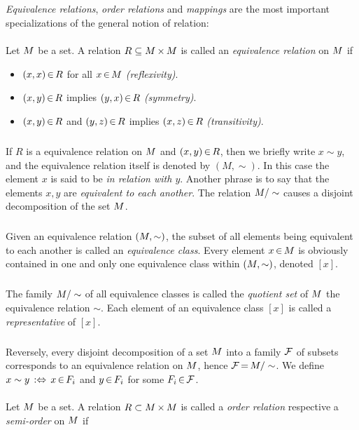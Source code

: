\documentclass[11pt,twoside]{article}
\begin{document}
\subparagraph{}
\textit{Equivalence relations}, \textit{order relations}
and \textit{mappings} are the most important specializations
of the general notion of relation:

\paragraph{} %
Let $\setM$ be a set.
A relation $R \subseteq \cross{\setM}{\setM}$ is called
an \textit{equivalence relation} on $\setM$ if

\begin{itemize}[leftmargin=15pt]
\item[1.] $(x,x) \xeof R$ for all $x \xeof \setM$ \textit{(reflexivity)}.
\item[2.] $(x,y) \xeof R$ implies $(y,x) \xeof R$ \textit{(symmetry)}.
\item[3.] $(x,y) \xeof R$ and $(y,z) \xeof R$ implies $(x,z) \xeof R$
            \textit{(transitivity)}.
\end{itemize}

\subparagraph{}
If $R$ is a equivalence relation on $\setM$ and $(x,y) \xeof R$,
then we briefly write $x \sim y$,
and the equivalence relation itself is denoted by $(M,\sim)$.
In this case the element $x$ is said to be
\textit{in relation with $y$}.
Another phrase is to say
that the elements $x,y$ are \textit{equivalent to each another}.
The relation $\setM/\sim$ causes a disjoint decomposition of the set $\setM$.

\subparagraph{}
Given an equivalence relation $(\setM,\sim)$,
the subset of all elements being equivalent to each another is called an 
\textit{equivalence class}.
Every element $x \xeof \setM$ is obviously contained
in one and only one equivalence class within $(\setM,\sim)$,
denoted $[x]$.

\subparagraph{}
The family $\setM/\sim$ of all equivalence classes is called the 
\textit{quotient set} of $\setM$ {\wrt} the equivalence relation $\sim$.
Each element of an equivalence class $[x]$ is called
a \textit{representative} of $[x]$.

\subparagraph{}
Reversely,
every disjoint decomposition of a set $\setM$ into a family $\cal{F}$
of subsets corresponds to an equivalence relation on $\setM$,
hence $\cal{F} \eq \setM/\sim$.
We define $x \sim y \, :\Leftrightarrow \, x \xeof F_i$
and $y \xeof F_i$ for some $F_i \xeof \cal{F}$.

\paragraph{} %
Let $\setM$ be a set.
A relation $R \subset \cross{\setM}{\setM}$ is called a \textit{order relation}
respective a \textit{semi-order} on $\setM$ if
\end{document}
